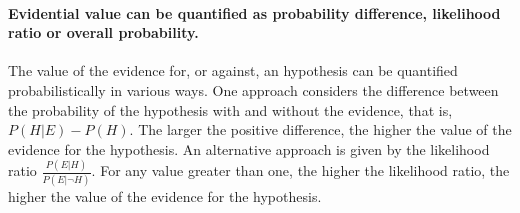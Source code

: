 \documentclass[10pt]{article}
\begin{document}
\paragraph{Evidential value can be quantified as probability difference, likelihood ratio or overall probability.}
The value of the evidence for, or against, an hypothesis 
can be quantified probabilistically in various ways. 
One approach considers the difference between the probability of 
the hypothesis with and without the evidence, that is, $P(H | E) - P(H)$.
The larger the positive difference, the higher the value of the evidence 
for the hypothesis. 
An alternative approach is given by the likelihood ratio $\frac{P(E|H)}{P(E| \neg H)}$. 
For any value greater than one, the higher the likelihood ratio, 
the higher the value of the evidence for the hypothesis. %
%
\end{document}

